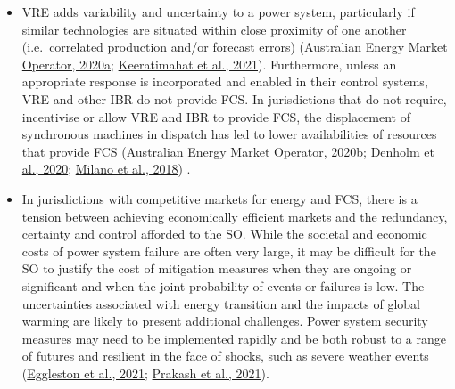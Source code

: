 \documentclass[12pt,a4paper,]{report}
\begin{document}
\begin{itemize}
\item
  VRE adds variability and uncertainty to a power system, particularly
  if similar technologies are situated within close proximity of one
  another (i.e.~correlated production and/or forecast errors)
  (\protect\hyperlink{ref-australianenergymarketoperatorRenewableIntegrationStudy2020}{Australian
  Energy Market Operator, 2020a};
  \protect\hyperlink{ref-keeratimahatAnalysisShorttermOperational2021}{Keeratimahat
  et al., 2021}). Furthermore, unless an appropriate response is
  incorporated and enabled in their control systems, VRE and other IBR
  do not provide FCS. In jurisdictions that do not require, incentivise
  or allow VRE and IBR to provide FCS, the displacement of synchronous
  machines in dispatch has led to lower availabilities of resources that
  provide FCS
  (\protect\hyperlink{ref-australianenergymarketoperatorRenewableIntegrationStudy2020c}{Australian
  Energy Market Operator, 2020b};
  \protect\hyperlink{ref-denholmInertiaPowerGrid2020}{Denholm et al.,
  2020};
  \protect\hyperlink{ref-milanoFoundationsChallengesLowInertia2018}{Milano
  et al., 2018}) .
\item
  In jurisdictions with competitive markets for energy and FCS, there is
  a tension between achieving economically efficient markets and the
  redundancy, certainty and control afforded to the SO. While the
  societal and economic costs of power system failure are often very
  large, it may be difficult for the SO to justify the cost of
  mitigation measures when they are ongoing or significant and when the
  joint probability of events or failures is low. The uncertainties
  associated with energy transition and the impacts of global warming
  are likely to present additional challenges. Power system security
  measures may need to be implemented rapidly and be both robust to a
  range of futures and resilient in the face of shocks, such as severe
  weather events
  (\protect\hyperlink{ref-egglestonSecurityResilienceTechnical2021}{Eggleston
  et al., 2021};
  \protect\hyperlink{ref-prakashResponseFrequencyControl2021}{Prakash et
  al., 2021}).
\end{itemize}
\end{document}
